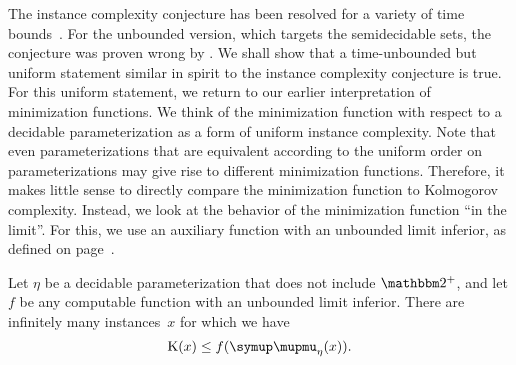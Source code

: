 The instance complexity conjecture has been resolved for a variety of time bounds~\parencite{fortnow1996resource,buhrman1996random}.
For the unbounded version, which targets the semidecidable sets, the conjecture was proven wrong by \textcite{kummer1996kolmogorov}.
We shall show that a time-unbounded but uniform statement similar in spirit to the instance complexity conjecture is true.
For this uniform statement, we return to our earlier interpretation of minimization functions.
We think of the minimization function with respect to a decidable parameterization as a form of uniform instance complexity.
Note that even parameterizations that are equivalent according to the uniform order on parameterizations may give rise to different minimization functions.
Therefore, it makes little sense to directly compare the minimization function to Kolmogorov complexity.
Instead, we look at the behavior of the minimization function \enquote{in the limit}.
For this, we use an auxiliary function with an unbounded limit inferior, as defined on page~\pageref{def:liminf}.
\begin{theorem}
\label{thm:parameterizedicc}%
  Let $\eta$ be a decidable parameterization that does not include $\binary^+$, and let $f$ be any computable function with an unbounded limit inferior.
  There are infinitely many instances~$x$ for which we have
  \begin{equation*}
    \KC(x) \le f(\mu_\eta(x)).
  \end{equation*}
\end{theorem}
